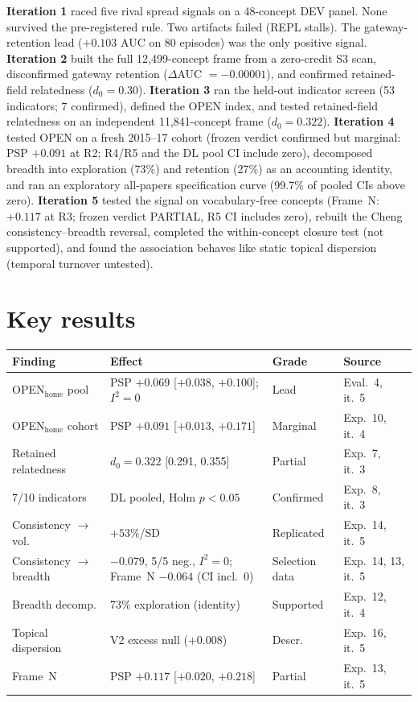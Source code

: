 \documentclass[10pt,letterpaper]{article}
\begin{document}
\textbf{Iteration 1} raced five rival spread signals on a 48-concept DEV panel. None survived the pre-registered rule. Two artifacts failed (REPL stalls). The gateway-retention lead ($+0.103$ AUC on 80 episodes) was the only positive signal.
\textbf{Iteration 2} built the full 12,499-concept frame from a zero-credit S3 scan, disconfirmed gateway retention ($\Delta$AUC $= -0.00001$), and confirmed retained-field relatedness ($d_0 = 0.30$).
\textbf{Iteration 3} ran the held-out indicator screen (53 indicators; 7 confirmed), defined the OPEN index, and tested retained-field relatedness on an independent 11,841-concept frame ($d_0 = 0.322$).
\textbf{Iteration 4} tested OPEN on a fresh 2015--17 cohort (frozen verdict confirmed but marginal: PSP $+0.091$ at R2; R4/R5 and the DL pool CI include zero), decomposed breadth into exploration (73\%) and retention (27\%) as an accounting identity, and ran an exploratory all-papers specification curve (99.7\% of pooled CIs above zero).
\textbf{Iteration 5} tested the signal on vocabulary-free concepts (Frame~N: $+0.117$ at R3; frozen verdict PARTIAL, R5 CI includes zero), rebuilt the Cheng consistency--breadth reversal, completed the within-concept closure test (not supported), and found the association behaves like static topical dispersion (temporal turnover untested).

\section{Key results}

\vspace{-0.5em}
\begin{table}[!htbp]
\centering
\small
\renewcommand{\arraystretch}{1.05}
\begin{tabularx}{\textwidth}{@{}>{\raggedright}p{3.2cm}>{\raggedright}p{3.2cm}>{\raggedright}p{1.5cm}>{\raggedright\arraybackslash}X@{}}
\toprule
Finding & Effect & Grade & Source \\
\midrule
OPEN$_{\text{home}}$ pool & PSP $+0.069$ [$+0.038$, $+0.100$]; $I^2\!=\!0$ & Lead & Eval.~4, it.~5 \\
OPEN$_{\text{home}}$ cohort & PSP $+0.091$ [$+0.013$, $+0.171$] & Marginal & Exp.~10, it.~4 \\
Retained relatedness & $d_0 = 0.322$ [0.291, 0.355] & Partial & Exp.~7, it.~3 \\
7/10 indicators & DL pooled, Holm $p < 0.05$ & Confirmed & Exp.~8, it.~3 \\
Consistency $\to$ vol. & $+53\%$/SD & Replicated & Exp.~14, it.~5 \\
Consistency $\to$ breadth & $-0.079$, 5/5 neg., $I^2\!=\!0$; Frame~N $-0.064$ (CI incl.\ 0) & Selection data & Exp.~14, 13, it.~5 \\
Breadth decomp. & 73\% exploration (identity) & Supported & Exp.~12, it.~4 \\
Topical dispersion & V2 excess null ($+0.008$) & Descr. & Exp.~16, it.~5 \\
Frame~N & PSP $+0.117$ [$+0.020$, $+0.218$] & Partial & Exp.~13, it.~5 \\
\bottomrule
\end{tabularx}
\end{table}
\vspace{-0.5em}
\end{document}
